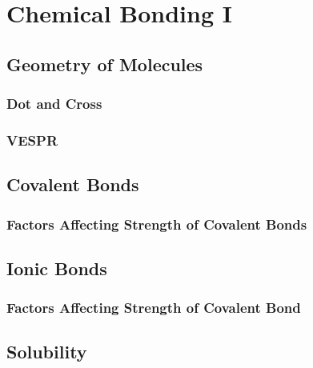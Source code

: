 \documentclass[../main]{subfiles}
\begin{document}
\section{Chemical Bonding I}

\subsection{Geometry of Molecules}

\subsubsection{Dot and Cross}

\subsubsection{VESPR}

\subsection{Covalent Bonds}

\subsubsection{Factors Affecting Strength of Covalent Bonds}

\subsection{Ionic Bonds}

\subsubsection{Factors Affecting Strength of Covalent Bond}

\subsection{Solubility}
\end{document}
